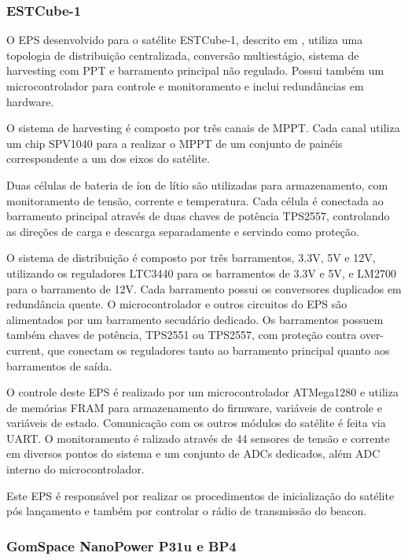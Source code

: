 \subsubsection{ESTCube-1}

O \gls{EPS} desenvolvido para o satélite ESTCube-1, descrito em \textcite{estcube-eps}, utiliza uma topologia de distribuição centralizada, conversão multiestágio, sistema de harvesting com \gls{PPT} e barramento principal não regulado.
Possui também um microcontrolador para controle e monitoramento e inclui redundâncias em hardware.

O sistema de harvesting é composto por três canais de \gls{MPPT}. Cada canal utiliza um chip SPV1040 para a realizar o \gls{MPPT} de um conjunto de painéis correspondente a um dos eixos do satélite.

Duas células de bateria de íon de lítio são utilizadas para armazenamento, com monitoramento de tensão, corrente e temperatura. Cada célula é conectada ao barramento principal através de duas chaves de potência TPS2557, controlando as direções de carga e descarga separadamente e servindo como proteção.

O sistema de distribuição é composto por três barramentos, 3.3V, 5V e 12V, utilizando os reguladores LTC3440 para os barramentos de 3.3V e 5V, e LM2700 para o barramento de 12V.
Cada barramento possui os conversores duplicados em redundância quente.
O microcontrolador e outros circuitos do \gls{EPS} são alimentados por um barramento secudário dedicado.
Os barramentos possuem também chaves de potência, TPS2551 ou TPS2557, com proteção contra over-current, que conectam os reguladores tanto ao barramento principal quanto aos barramentos de saída.

O controle deste \gls{EPS} é realizado por um microcontrolador ATMega1280 e utiliza de memórias FRAM para armazenamento do firmware, variáveis de controle e variáveis de estado.
Comunicação com os outros módulos do satélite é feita via \gls{UART}.
O monitoramento é ralizado através de 44 sensores de tensão e corrente em diversos pontos do sistema e um conjunto de ADCs dedicados, além ADC interno do microcontrolador.

Este \gls{EPS} é responsável por realizar os procedimentos de inicialização do satélite pós lançamento e também por controlar o rádio de transmissão do beacon.




\subsubsection{GomSpace NanoPower P31u e BP4}


